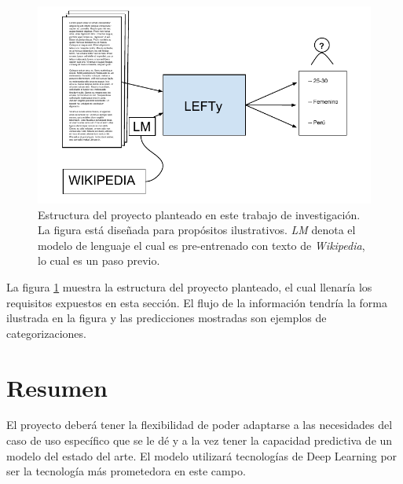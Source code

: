 \begin{figure}
\includegraphics[scale=1.0]{Figures/projectstruct.pdf}
\caption{Estructura del proyecto planteado en este trabajo de investigación. La figura está diseñada para propósitos ilustrativos. \textit{LM} denota el modelo de lenguaje el cual es pre-entrenado con texto de \textit{Wikipedia}, lo cual es un paso previo.}
\label{fig:projstruct}
\end{figure}

La figura \ref{fig:projstruct} muestra la estructura del proyecto planteado, el cual llenaría los requisitos expuestos en esta sección. El flujo de la información tendría la forma ilustrada en la figura y las predicciones mostradas son ejemplos de categorizaciones.

\section{Resumen}

El proyecto deberá tener la flexibilidad de poder adaptarse a las necesidades del caso de uso específico que se le dé y a la vez tener la capacidad predictiva de un modelo del estado del arte. El modelo utilizará tecnologías de Deep Learning por ser la tecnología más prometedora en este campo.





